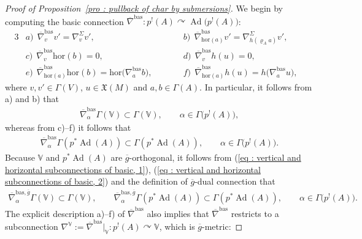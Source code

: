 \documentclass[11pt]{article}
\numberwithin{equation}{section}
\newcommand{\acts}{\curvearrowright}
\newcommand{\8}{\infty}
\newcommand{\X}{\mathfrak{X}}
\begin{document}
\begin{proof}[Proof of Proposition~\ref{pro : pullback of char by submersions}]
 We begin by computing the basic connection $\overline{\nabla}^{\mathrm{bas}}\colon p^!(A) \acts \operatorname{Ad}\big(p^!(A)\big)$:
 \begin{alignat*}{3}
& a) \ \ \overline{\nabla}^{\mathrm{bas}}_vv'=\nabla^{\Sigma}_{v}v', \qquad && b) \ \ \overline{\nabla}^{\mathrm{bas}}_{\mathrm{hor}(a)}v'=\nabla^{\Sigma}_{h(\varrho_Aa)}v', & \\
& c) \ \ \overline{\nabla}^{\mathrm{bas}}_v\mathrm{hor}(b)=0, \qquad && d) \ \ \overline{\nabla}^{\mathrm{bas}}_vh(u)=0, & \\
& e) \ \ \overline{\nabla}^{\mathrm{bas}}_{\mathrm{hor}(a)}\mathrm{hor}(b)=\mathrm{hor}\big(\nabla^{\mathrm{bas}}_{a}b\big), \qquad && f) \ \
\overline{\nabla}^{\mathrm{bas}}_{\mathrm{hor}(a)}h(u)=h\big(\nabla^{\mathrm{bas}}_au\big), &
 \end{alignat*}where $v,v' \in \Gamma(V)$, $u \in \X(M)$ and $a,b \in \Gamma(A)$. In particular, it follows from a) and b) that
 \begin{gather}\label{eq : vertical and horizontal subconnections of basic, 1}
 \overline{\nabla}^{\mathrm{bas}}_{\alpha}\Gamma(\mathbb{V}) \subset \Gamma(\mathbb{V}), \qquad \alpha \in \Gamma\big(p^!(A)\big),
 \end{gather}whereas from c)--f) it follows that
 \begin{gather}\label{eq : vertical and horizontal subconnections of basic, 2}
 \overline{\nabla}^{\mathrm{bas}}_{\alpha}\Gamma(p^*\operatorname{Ad}(A)) \subset \Gamma(p^*\operatorname{Ad}(A)), \qquad \alpha \in \Gamma\big(p^!(A)\big).
 \end{gather}Because $\mathbb{V}$ and $p^*\operatorname{Ad}(A)$ are $\overline{g}$-orthogonal, it follows from (\ref{eq : vertical and horizontal subconnections of basic, 1}), (\ref{eq : vertical and horizontal subconnections of basic, 2}) and the definition of $\overline{g}$-dual connection that
 \begin{gather}\label{eq : vertical and horizontal subconnections of g-dual of basic}
 \overline{\nabla}^{\mathrm{bas},\overline{g}}_{\alpha}\Gamma(\mathbb{V}) \subset \Gamma(\mathbb{V}), \qquad \overline{\nabla}^{\mathrm{bas},\overline{g}}_{\alpha}\Gamma(p^*\operatorname{Ad}(A)) \subset \Gamma(p^*\operatorname{Ad}(A)), \qquad \alpha \in \Gamma\big(p^!(A)\big).
 \end{gather}
The explicit description a)--f) of $\overline{\nabla}^{\mathrm{bas}}$ also implies that $\overline{\nabla}^{\mathrm{bas}}$ restricts to a subconnection $\nabla^{\mathbb{V}}:=\overline{\nabla}^{\mathrm{bas}}|_{\mathbb{V}}\colon p^!(A) \acts \mathbb{V}$, which is $\overline{g}$-metric:

\end{proof}
\end{document}
